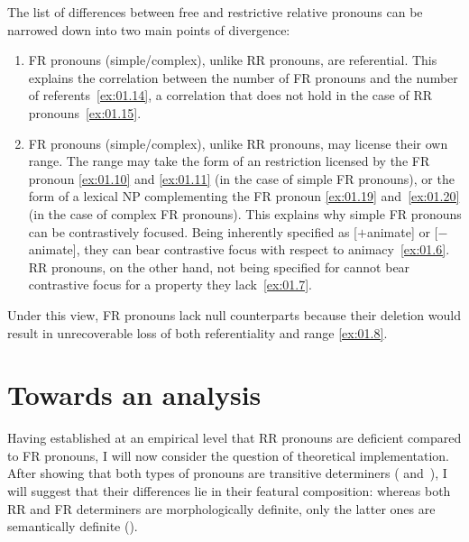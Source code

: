 \documentclass[output=paper]{langsci/langscibook}
\begin{document}
The list of differences between free and restrictive relative pronouns can be
narrowed down into two main points of divergence:

\begin{enumerate}
\item \gls{FR} pronouns (simple/complex), unlike \gls{RR} pronouns, are
referential. This explains the correlation between the number of \gls{FR}
pronouns and the number of referents~\eqref{ex:01.14}, a correlation that does not hold in
the case of \gls{RR} pronouns~\eqref{ex:01.15}.

\item \gls{FR} pronouns
(simple/complex), unlike \gls{RR} pronouns, may license their own range. The
range may take the form of an  restriction licensed by the
\gls{FR} pronoun \eqref{ex:01.10} and \eqref{ex:01.11} (in the case of
simple \gls{FR} pronouns), or the form of a lexical NP complementing the
\gls{FR} pronoun \eqref{ex:01.19} and~\eqref{ex:01.20} (in the case of
complex \gls{FR} pronouns). This explains why simple \gls{FR} pronouns can be
contrastively focused. Being inherently specified as [$+$animate] or
[$-$animate], they can bear contrastive focus with respect to animacy~\eqref{ex:01.6}.  \gls{RR} pronouns, on
    the other hand, not being specified for  cannot bear
    contrastive focus for a property they
    lack~\eqref{ex:01.7}.
\end{enumerate}

Under this view, \gls{FR} pronouns lack null counterparts because their
deletion would result in unrecoverable loss of both referentiality and range
\eqref{ex:01.8}.

\section{Towards an analysis}\label{sec:01.4}

Having established at an empirical level that \gls{RR} pronouns are deficient compared to \gls{FR}
pronouns, I will now consider the question of theoretical implementation.
After showing that both types of pronouns are transitive determiners
( and~), I will suggest that their differences
lie in their featural composition: whereas both \gls{RR} and \gls{FR}
determiners are morphologically definite, only the latter ones are semantically
definite ().
\end{document}
